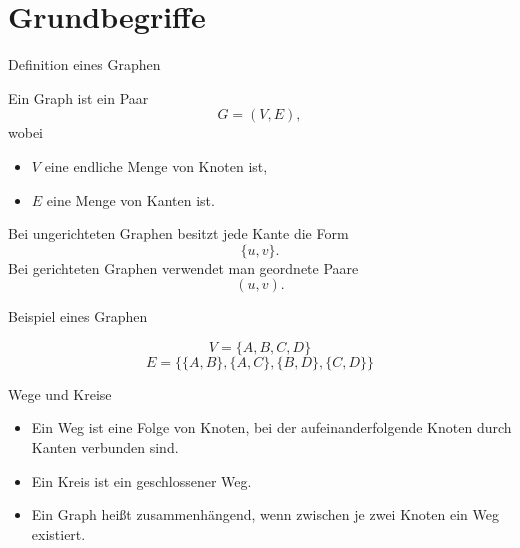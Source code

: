 \documentclass{beamer}
\begin{document}
\section{Grundbegriffe}
\begin{frame}{Definition eines Graphen}
\begin{definition}
Ein Graph ist ein Paar
\[G=(V,E),\]
wobei
\begin{itemize}
    \item \(V\) eine endliche Menge von Knoten ist,
    \item \(E\) eine Menge von Kanten ist.
\end{itemize}
\end{definition}
\vspace{0.4cm}
Bei ungerichteten Graphen besitzt jede Kante die Form
\[\{u,v\}.\]
Bei gerichteten Graphen verwendet man geordnete Paare
\[(u,v).\]
\end{frame}
\begin{frame}{Beispiel eines Graphen}
\begin{center}
\end{center}
\vspace{0.3cm}
\[V=\{A,B,C,D\}\]
\[E=\{\{A,B\},\{A,C\},\{B,D\},\{C,D\}\}\]
\end{frame}
\begin{frame}{Wege und Kreise}
\begin{definition}
\begin{itemize}
    \item Ein Weg ist eine Folge von Knoten, bei der aufeinanderfolgende Knoten durch Kanten verbunden sind.  
    \item Ein Kreis ist ein geschlossener Weg.   
    \item Ein Graph heißt zusammenhängend, wenn zwischen je zwei Knoten ein Weg existiert.
\end{itemize}
\end{definition}
\end{frame}
\end{document}
